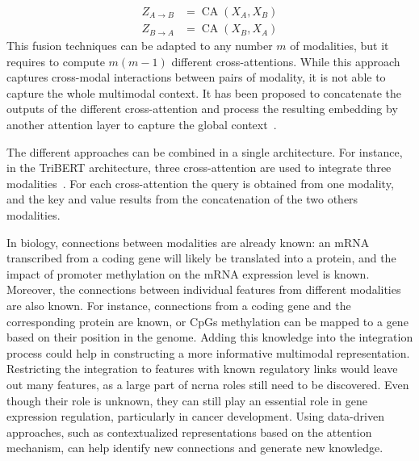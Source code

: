 \documentclass[../main.tex]{subfiles}
\begin{document}
\begin{description}[%
	        style=multiline,
	        leftmargin=!,
	        labelwidth=3cm,
	    ]
		    \setlength{\abovedisplayskip}{2pt}
		    \setlength{\belowdisplayskip}{2pt}
		    \setlength{\abovedisplayshortskip}{0pt}
		    \setlength{\belowdisplayshortskip}{0pt}
		    \begin{align*}
		        Z_{A \rightarrow B} & = \operatorname{CA}\left(X_A, X_B \right) \\
		        Z_{B \rightarrow A} & = \operatorname{CA}\left(X_B, X_A \right)
		    \end{align*} %
		    \endgroup
		    This fusion techniques can be adapted to any number \(m\) of modalities, but it requires to compute \(m\left(m-1\right)\) different cross-attentions.
		    While this approach captures cross-modal interactions between pairs of modality, it is not able to capture the whole multimodal context.
		    It has been proposed to concatenate the outputs of the different cross-attention and process the resulting embedding by another attention layer to capture the global context~\cite{tsai-etal-2019-multimodal}.
	\end{description}
	The different approaches can be combined in a single architecture.
	For instance, in the TriBERT architecture, three cross-attention are used to integrate three modalities~\cite{TriBERT}.
	For each cross-attention the query is obtained from one modality, and the key and value results from the concatenation of the two others modalities.

	In biology, connections between modalities are already known: an mRNA transcribed from a coding gene will likely be translated into a protein, and the impact of promoter methylation on the mRNA expression level is known.
	Moreover, the connections between individual features from different modalities are also known.
	For instance, connections from a coding gene and the corresponding protein are known, or CpGs methylation can be mapped to a gene based on their position in the genome.
	Adding this knowledge into the integration process could help in constructing a more informative multimodal representation.
	Restricting the integration to features with known regulatory links would leave out many features, as a large part of \gls{ncrna} roles still need to be discovered.
	Even though their role is unknown, they can still play an essential role in gene expression regulation, particularly in cancer development.
	Using data-driven approaches, such as contextualized representations based on the attention mechanism, can help identify new connections and generate new knowledge.
\end{document}
